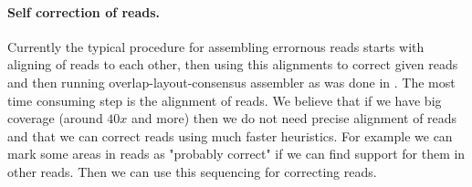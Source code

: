 \paragraph{Self correction of reads.}
Currently the typical procedure for assembling errornous reads
starts with aligning of reads to each other, then using this alignments
to correct given reads and then running overlap-layout-consensus assembler
as was done in \cite{MHAP}.
The most time consuming step is the alignment of reads.
We believe that if we have big coverage (around $40x$ and more) then
we do not need precise alignment of reads and that we can
correct reads using much faster heuristics. For example
we can mark some areas in reads as "probably correct" if we can
find support for them in other reads. Then we can
use this sequencing for correcting reads.

\label{LastPage}

